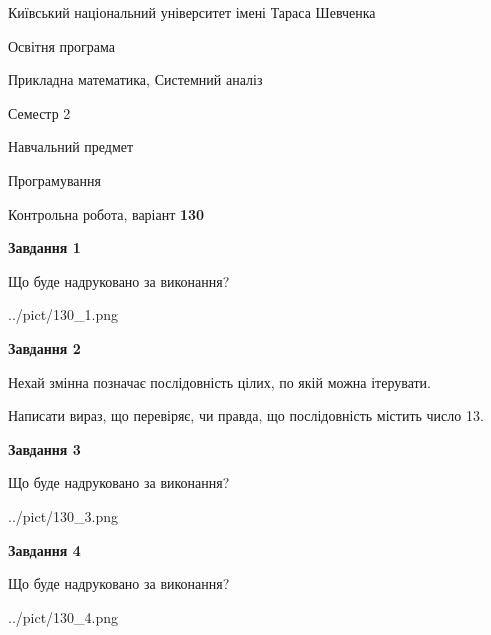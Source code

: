 \documentclass[12pt, ukrainian]{article}
\begin{document}
{{\begin {small}\par
{ \center  Київський національний університет імені Тараса Шевченка \par}
{\parbox {5 cm}{Освітня програма \hfill}{\parbox {8 cm}{Прикладна математика, Системний аналіз \hfill}}\parbox {5 cm}{\hfill Семестр 2}}\par
{\parbox {5 cm} {Навчальний предмет \hfill}\parbox {7 cm}{Програмування \hfill}\parbox {6cm}{\hfill}\par}\vspace{-7pt} \end{small}}{\center Контрольна робота, варіант  \No \textbf
{ 130 }\par}}
{
\begin {large}
{\begin {center}\textbf{Завдання 1}\end {center}}\par
Що буде надруковано за виконання?\par\par
\begin{center}
	{../pict/130_1.png}
\end{center}
\newpage

{\begin {center}\textbf{Завдання 2}\end {center}}\par
Нехай змінна  позначає послідовність цілих, по якій можна ітерувати.

Написати вираз, що перевіряє, чи правда, що послідовність  містить число 13.\par
\newpage

{\begin {center}\textbf{Завдання 3}\end {center}}\par
Що буде надруковано за виконання?
\begin{center}
	{../pict/130_3.png}
\end{center}
\newpage

{\begin {center}\textbf{Завдання 4}\end {center}}\par
Що буде надруковано за виконання?\par
\begin{center}
	{../pict/130_4.png}
\end{center}
\newpage


\end{large}}
\end{document}
